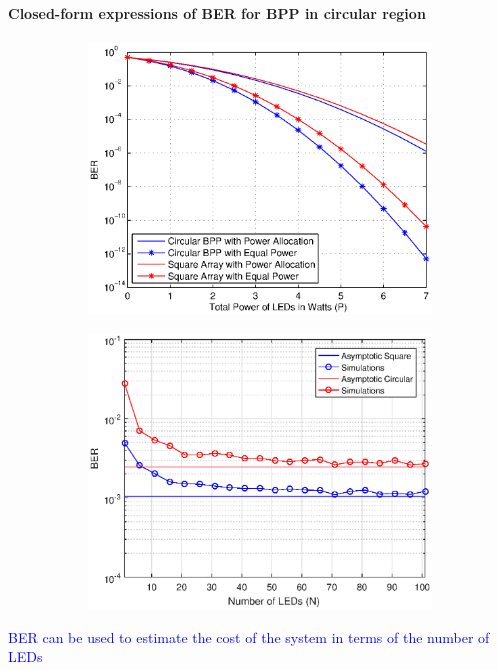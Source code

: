 \documentclass{beamer}
\theoremstyle{remark}
\begin{document}
\begin{frame}
\frametitle{\,}
\framesubtitle{Closed-form expressions of BER for BPP in circular region}
\begin{figure}
 \begin{subfigure}[t]{0.49\framewidth}
        \centering
        \includegraphics[width=\columnwidth]{berVSp}
\label{fig1:subfig4}
    \end{subfigure}
        \begin{subfigure}[t]{0.49\framewidth}
        \centering
        \includegraphics[width=\columnwidth]{berVSNdiffGeom}
\label{fig1:subfig2}
    \end{subfigure}
\end{figure}
\vfill
 \textcolor{blue}{ BER can be used to estimate the cost of the system in terms of the number of LEDs}
\end{frame}
\end{document}
